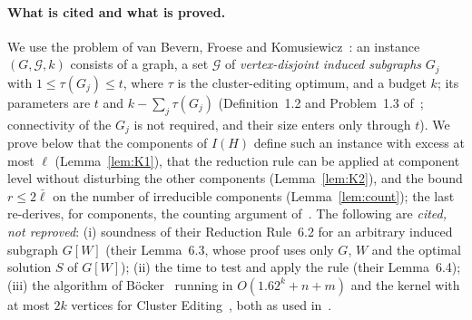 \paragraph{What is cited and what is proved.}
We use the problem of van Bevern, Froese and Komusiewicz~\cite{BFK18}: an instance $(G,\mathcal G,k)$ consists of a graph, a set $\mathcal G$ of \emph{vertex-disjoint induced subgraphs} $G_j$ with $1\le\tau(G_j)\le t$, where $\tau$ is the cluster-editing optimum, and a budget $k$; its parameters are $t$ and $k-\sum_j\tau(G_j)$ (Definition~1.2 and Problem~1.3 of~\cite{BFK18}; connectivity of the $G_j$ is not required, and their size enters only through $t$). We prove below that the components of $I(H)$ define such an instance with excess at most $\ell$ (Lemma~\ref{lem:K1}), that the reduction rule can be applied at component level without disturbing the other components (Lemma~\ref{lem:K2}), and the bound $r\le2\bar\ell$ on the number of irreducible components (Lemma~\ref{lem:count}); the last re-derives, for components, the counting argument of~\cite[Lemmas~3.2 and~6.5]{BFK18}. The following are \emph{cited, not reproved}: (i) soundness of their Reduction Rule~6.2 for an arbitrary induced subgraph $G[W]$ (their Lemma~6.3, whose proof uses only $G$, $W$ and the optimal solution $S$ of $G[W]$); (ii) the time to test and apply the rule (their Lemma~6.4); (iii) the algorithm of B\"ocker~\cite{Boe12} running in $O(1.62^k+n+m)$ and the kernel with at most $2k$ vertices for Cluster Editing~\cite{CM12}, both as used in~\cite{BFK18}.

